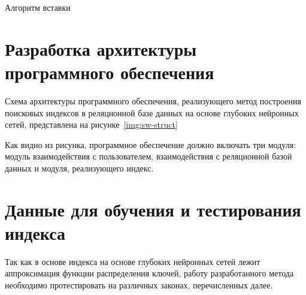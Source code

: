 \begin{algorithm}[H]
    \caption{Алгоритм вставки ~~~~~~~~~~~~~~~~~~~~~~~~~~~~~~~~~~~~~~~~~~~~~~~~}
    \label{alg:insert}
    \small


\end{algorithm}
\vspace{0.5cm}

\section{Разработка архитектуры программного обеспечения}

Схема архитектуры программного обеспечения, реализующего метод построения
поисковых индексов в реляционной базе данных на основе глубоких нейронных сетей,
представлена на рисунке~\ref{img:sw-struct}


Как видно из рисунка, программное обеспечение должно включать три модуля:
модуль взаимодействия с пользователем, взаимодействия с реляционной базой данных и
модуля, реализующего индекс.


\section{Данные для обучения и тестирования индекса}

Так как в основе индекса на основе глубоких нейронных сетей лежит аппроксимация
функции распределения ключей, работу разработанного метода необходимо
протестировать на различных законах, перечисленных далее.

